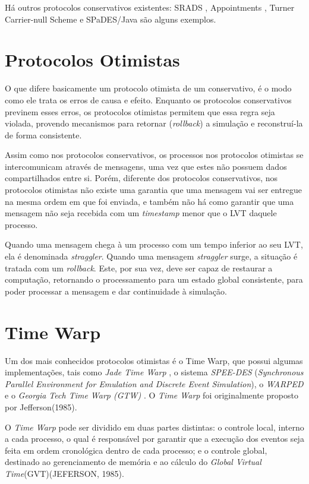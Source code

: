 	Há outros protocolos conservativos existentes: SRADS \cite{REYNOLDS82} , Appointments \cite{REYNOLDS84} , Turner Carrier-null Scheme \cite{CAITURNER} e SPaDES/Java\cite{TEONG} são alguns exemplos.


\section{Protocolos Otimistas}
\label{sec:protootimo}

O que difere basicamente um protocolo otimista de um conservativo, é o modo como ele trata os erros de causa e efeito. Enquanto os protocolos conservativos previnem esses erros, os protocolos otimistas permitem que essa regra seja violada, provendo mecanismos para retornar (\textit{rollback}) a simulação e reconstruí-la de forma consistente.  

Assim como nos protocolos conservativos, os processos nos protocolos otimistas se intercomunicam através de mensagens, uma vez que estes não possuem dados compartilhados entre si. Porém, diferente dos protocolos conservativos, nos protocolos otimistas não existe uma garantia que uma mensagem vai ser entregue na mesma ordem em que foi enviada, e também não há como garantir que uma mensagem não seja recebida com um \textit{timestamp} menor que o LVT daquele processo.

Quando uma mensagem chega à um processo com um tempo inferior ao seu LVT, ela é denominada  \textit{straggler}. Quando uma mensagem \textit{straggler} surge, a situação  é tratada com um \textit{rollback}. Este, por sua vez, deve ser capaz de restaurar a computação, retornando o processamento para um estado global consistente, para poder processar a mensagem e dar continuidade à simulação.

	
\section{Time Warp}
	Um dos mais conhecidos protocolos otimistas é o Time Warp, que possui algumas implementações, tais como \textit{Jade Time Warp} \cite{BAEZNER1}, o sistema \textit{SPEE-DES} (\textit{Synchronous Parallel Environment for Emulation and Discrete Event Simulation})\cite{STEINMAN92}, o \textit{WARPED} \cite{WARPED} e o \textit{Georgia Tech Time Warp (GTW)} \cite{DAS94}. O \textit{Time Warp} foi originalmente proposto por Jefferson(1985). 

O \textit{Time Warp} pode ser dividido em duas partes distintas: o controle local, interno a cada processo, o qual é responsável por garantir que a execução dos eventos seja feita em ordem cronológica dentro de cada processo; e o controle global, destinado ao gerenciamento de memória e ao cálculo do \textit{Global Virtual Time}(GVT)(JEFERSON, 1985).

